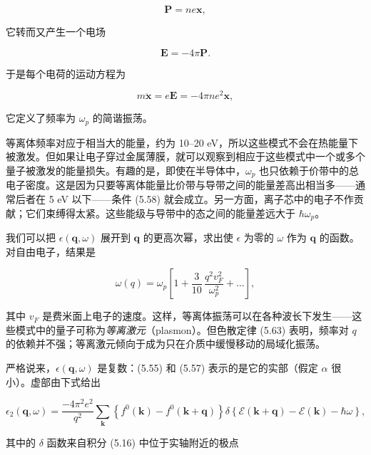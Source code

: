 \begin{equation*}
\mathbf{P} = ne\mathbf{x},
\tag{5.60}
\end{equation*}

它转而又产生一个电场

\begin{equation*}
\mathbf{E} = -4\pi\mathbf{P} .
\tag{5.61}
\end{equation*}

于是每个电荷的运动方程为

\begin{equation*}
m\ddot{\mathbf{x}} = e\mathbf{E} = -4\pi n e^2 \mathbf{x},
\tag{5.62}
\end{equation*}

它定义了频率为 $\omega_p$ 的简谐振荡。

等离体频率对应于相当大的能量，约为 10–20 eV，所以这些模式不会在热能量下被激发。但如果让电子穿过金属薄膜，就可以观察到相应于这些模式中一个或多个量子被激发的能量损失。有趣的是，即使在半导体中，$\omega_p$ 也只依赖于价带中的总电子密度。这是因为只要等离体能量比价带与导带之间的能量差高出相当多——通常后者在 5 eV 以下——条件 (5.58) 就会成立。另一方面，离子芯中的电子不作贡献；它们束缚得太紧。这些能级与导带中的态之间的能量差远大于 $\hbar\omega_p$。

我们可以把 $\epsilon(\mathbf{q},\omega)$ 展开到 $\mathbf{q}$ 的更高次幂，求出使 $\epsilon$ 为零的 $\omega$ 作为 $\mathbf{q}$ 的函数。对自由电子，结果是

\begin{equation*}
\omega(q) = \omega_p \left[ 1 + \frac{3}{10}\, \frac{q^2 v_F^2}{\omega_p^2} + \ldots \right],
\tag{5.63}
\end{equation*}

其中 $v_F$ 是费米面上电子的速度。这样，等离体振荡可以在各种波长下发生——这些模式中的量子可称为\emph{等离激元}（plasmon）。但色散定律 (5.63) 表明，频率对 $q$ 的依赖并不强；等离激元倾向于成为只在介质中缓慢移动的局域化振荡。

严格说来，$\epsilon(\mathbf{q},\omega)$ 是复数：(5.55) 和 (5.57) 表示的是它的实部（假定 $\alpha$ 很小）。虚部由下式给出

\begin{equation*}
\epsilon_2(\mathbf{q},\omega) = \frac{-4\pi^2 e^2}{q^2} \sum_{\mathbf{k}} \left\{ f^0(\mathbf{k}) - f^0(\mathbf{k}+\mathbf{q}) \right\} \delta\!\left\{ \mathcal{E}(\mathbf{k}+\mathbf{q}) - \mathcal{E}(\mathbf{k}) - \hbar\omega \right\},
\tag{5.64}
\end{equation*}

其中的 $\delta$ 函数来自积分 (5.16) 中位于实轴附近的极点

